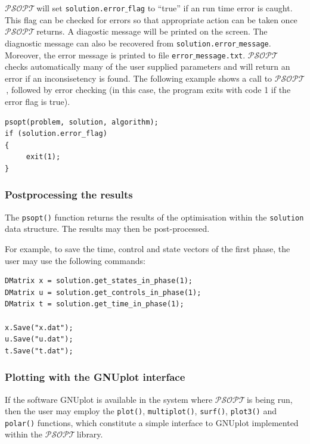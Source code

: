 \documentclass[a4paper,11pt]{report}    %
\newcommand{\psopt}{$\mathcal{PSOPT}$\,}  %
\newenvironment{shadedframe}{%
  \def\FrameCommand{\fcolorbox{black}{shadecolor}}%
  \MakeFramed {\FrameRestore}}
{\endMakeFramed}
\begin{document}
\psopt will set \texttt{solution.error$\_$flag} to ``true'' if an run time error is caught.
This flag can be checked for errors so that appropriate action can be taken once
\psopt returns. A diagostic message will be printed on the screen. The
diagnostic message can also be recovered from \texttt{solution.error$\_$message}. Moreover, the error
message is printed to file \texttt{error$\_$message.txt}. \psopt
checks automatically many of the user supplied parameters and will return an error
if an inconsisetency is found. The following example shows a call to \psopt, followed
by error checking (in this case, the program exits with code 1 if the
error flag is true). 

\begin{verbatim}
psopt(problem, solution, algorithm);
if (solution.error_flag)
{
     exit(1);
}
\end{verbatim}





\subsubsection{Postprocessing the results}

The \texttt{psopt()} function returns the results of the optimisation within the \verb|solution| data structure.
The results may then be post-processed. 

\begin{shadedframe}
For example, to save the time, control and state vectors
of the first phase, the user may use the following commands:

\begin{verbatim}
DMatrix x = solution.get_states_in_phase(1);
DMatrix u = solution.get_controls_in_phase(1);
DMatrix t = solution.get_time_in_phase(1);

x.Save("x.dat");
u.Save("u.dat");
t.Save("t.dat");
\end{verbatim}

\end{shadedframe}


\subsubsection{Plotting with the GNUplot interface}

If the software GNUplot is available in the system where \psopt is being run, then the user may
employ the \texttt{plot()}, \texttt{multiplot()}, \texttt{surf()}, \texttt{plot3()} and \texttt{polar()} functions, which constitute
a simple interface to GNUplot implemented within the \psopt library. 
\end{document}

